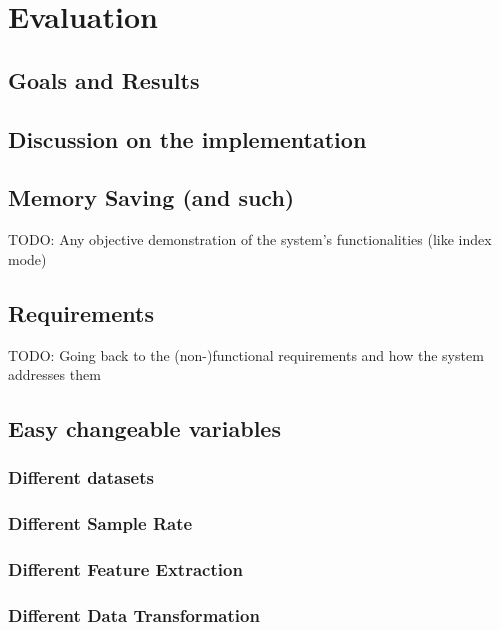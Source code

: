 \chapter{Evaluation}


\section{Goals and Results}

\section{Discussion on the implementation}

\section{Memory Saving (and such)}

TODO: Any objective demonstration of the system's functionalities (like index mode)

\section{Requirements}

TODO: Going back to the (non-)functional requirements and how the system addresses them


\section{Easy changeable variables}

\subsection{Different datasets}

\subsection{Different Sample Rate}

\subsection{Different Feature Extraction}

\subsection{Different Data Transformation}

